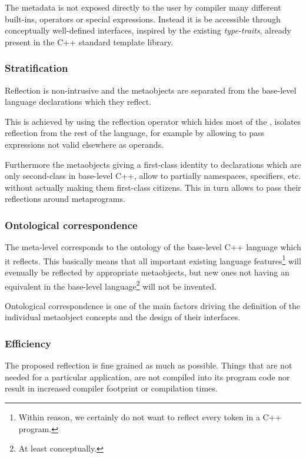 The metadata is not exposed directly to the user by compiler many different
built-ins, operators or special expressions.
Instead it is be accessible through conceptually well-defined interfaces,
inspired by the existing {\em type-traits}, already present in
the C++ standard template library.

\subsubsection{Stratification}
\label{design-stratification}

Reflection is non-intrusive and the metaobjects are separated
from the base-level language declarations which they reflect.

This is achieved by using the reflection operator which hides most of the
, isolates reflection from the rest of the language,
for example by allowing to pass expressions not valid elsewhere as operands.

Furthermore the metaobjects giving a first-class identity to declarations
which are only second-class in base-level C++,
allow to partially  namespaces, specifiers, etc. without actually
making them first-class citizens. This in turn allows to pass their reflections around
metaprograms.

\subsubsection{Ontological correspondence}
\label{design-onto-corr}

The meta-level 
corresponds to the ontology of the base-level C++ language
which it reflects. This basically means that all important existing language
features\footnote{Within reason, we certainly do not want to reflect every token
in a C++ program.} will evenually be reflected by appropriate metaobjects,
but new ones not having an equivalent in the base-level language\footnote{At least
conceptually.} will not be invented.

Ontological correspondence is one of the main factors driving the definition of the
individual metaobject concepts and the design of their interfaces.


\subsubsection{Efficiency}
\label{design-efficiency}

The proposed reflection is fine grained as much as possible.
Things that are not needed for a particular application,
are not compiled into its program code nor result in
increased compiler footprint or compilation times.

